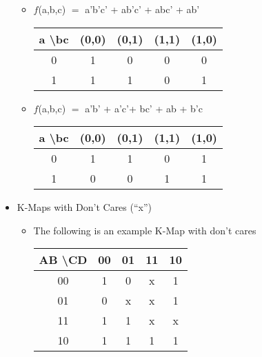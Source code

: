 \begin{itemize}
\begin{itemize}
      \item $f$(a,b,c) $=$ a'b'c' + ab'c' + abc' + ab'

        \begin{center}
          \begin{tabular}[h!]{c | c c c c |}
            a \textbackslash bc & (0,0) & (0,1) & (1,1) & (1,0)\\
            \hline
            0 & 1 & 0 & 0 & 0\\
            1 & 1 & 1 & 0 & 1\\
            \hline
          \end{tabular}
        \end{center}

      \item $f$(a,b,c) $=$ a'b' + a'c'+ bc' + ab + b'c

        \begin{center}
          \begin{tabular}[h!]{c | c c c c |}
            a \textbackslash bc & (0,0) & (0,1) & (1,1) & (1,0)\\
            \hline
            0 & 1 & 1 & 0 & 1\\
            1 & 0 & 0 & 1 & 1\\
            \hline
          \end{tabular}
        \end{center}

    \end{itemize}

  \item K-Maps with Don't Cares (``x'')

    \begin{itemize}

      \item The following is an example K-Map with don't cares

        \begin{center}
          \begin{tabular}[h!]{c | c c c c |}
            AB \textbackslash CD & 00 & 01 & 11 & 10\\
            \hline
            00 & 1 & 0 & x & 1\\
            \hline
            01 & 0 & x & x & 1\\
            \hline
            11 & 1 & 1 & x & x\\
            \hline
            10 & 1 & 1 & 1 & 1\\
            \hline
          \end{tabular}
        \end{center}


\end{itemize}
\end{itemize}
